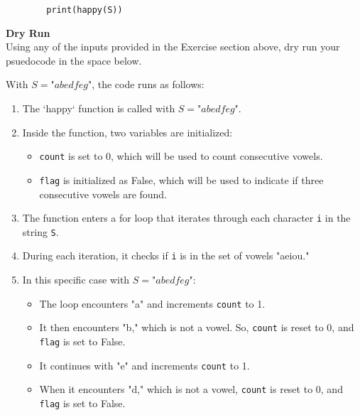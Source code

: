 \documentclass[a4paper]{exam}
\newcommand\heading[1]{\textbf{#1}}
\begin{document}
\begin{questions}
\begin{verbatim}
        print(happy(S))
    \end{verbatim}

    

 

    \heading{Dry Run}\\
    Using any of the inputs provided in the Exercise section above, dry run your psuedocode in the space below.

With $S = \textit{"abedfeg"}$, the code runs as follows:

\begin{enumerate}
    \item The `happy` function is called with $S = \textit{"abedfeg"}$.
    
    \item Inside the function, two variables are initialized:
    
    \begin{itemize}
        \item \texttt{count} is set to 0, which will be used to count consecutive vowels.
        
        \item \texttt{flag} is initialized as False, which will be used to indicate if three consecutive vowels are found.
    \end{itemize}
    
    \item The function enters a for loop that iterates through each character \texttt{i} in the string \texttt{S}.
    
    \item During each iteration, it checks if \texttt{i} is in the set of vowels "aeiou." 
    \item In this specific case with $S = \textit{"abedfeg"}$:
    
    \begin{itemize}
        \item The loop encounters "a" and increments \texttt{count} to 1.
        
        \item It then encounters "b," which is not a vowel. So, \texttt{count} is reset to 0, and \texttt{flag} is set to False.
        
        \item It continues with "e" and increments \texttt{count} to 1.
        
        \item When it encounters "d," which is not a vowel, \texttt{count} is reset to 0, and \texttt{flag} is set to False.
        

\end{itemize}
\end{enumerate}
\end{questions}
\end{document}
